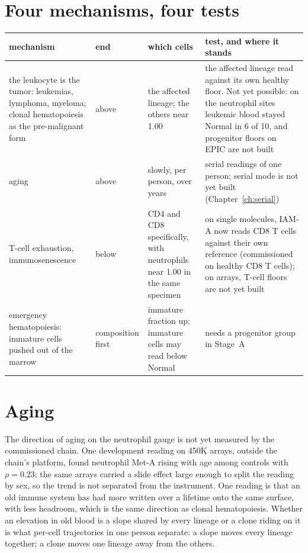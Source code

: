 

\section{Four mechanisms, four tests}

\begin{center}\small
\begin{longtable}{@{}p{}p{}p{}p{}@{}}
\toprule mechanism & end & which cells & test, and where it stands \\\midrule\endhead
the leukocyte is the tumor: leukemias, lymphoma, myeloma; clonal hematopoiesis as the pre-malignant form & above & the affected lineage; the others near 1.00 & the affected lineage read against its own healthy floor. Not yet possible: on the neutrophil sites leukemic blood stayed Normal in 6 of 10, and progenitor floors on EPIC are not built \\
aging & above & slowly, per person, over years & serial readings of one person; serial mode is not yet built (Chapter~\ref{ch:serial}) \\
T-cell exhaustion, immunosenescence & below & CD4 and CD8 specifically, with neutrophils near 1.00 in the same specimen & on single molecules, IAM-A now reads CD8 T cells against their own reference (commissioned on healthy CD8 T cells); on arrays, T-cell floors are not yet built \\
emergency hematopoiesis: immature cells pushed out of the marrow & composition first & immature fraction up; immature cells may read below Normal & needs a progenitor group in Stage~A \\\bottomrule
\end{longtable}
\end{center}

\section{Aging}

The direction of aging on the neutrophil gauge is not yet measured by the commissioned chain. \openprob{} One development reading on 450K arrays, outside the chain's platform, found
neutrophil Met-A rising with age among controls with $\rho=0.23$; the same arrays carried a slide effect large
enough to split the reading by sex, so the trend is not separated from the instrument. \observed{} One reading is that an old immune system has had more written
over a lifetime onto the same surface, with less headroom, which is the same direction as clonal hematopoiesis. \conjecture{} Whether an elevation in old blood is a slope
shared by every lineage or a clone riding on it is what per-cell trajectories in one person separate: a slope moves every lineage together; a clone moves one lineage away from
the others.

